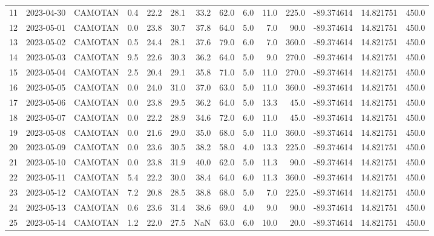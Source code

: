 \documentclass[12pt]{article}
\begin{document}
\begin{center}
\begin{tabular}{lllrrrrrrrrrrr}
11  & 2023-04-30 &  CAMOTAN &     0.4 &  22.2 &   28.1 &  33.2 &     62.0 &  6.0 &        11.0 &       225.0 & -89.374614 &  14.821751 &    450.0 \\
12  & 2023-05-01 &  CAMOTAN &     0.0 &  23.8 &   30.7 &  37.8 &     64.0 &  5.0 &         7.0 &        90.0 & -89.374614 &  14.821751 &    450.0 \\
13  & 2023-05-02 &  CAMOTAN &     0.5 &  24.4 &   28.1 &  37.6 &     79.0 &  6.0 &         7.0 &       360.0 & -89.374614 &  14.821751 &    450.0 \\
14  & 2023-05-03 &  CAMOTAN &     9.5 &  22.6 &   30.3 &  36.2 &     64.0 &  5.0 &         9.0 &       270.0 & -89.374614 &  14.821751 &    450.0 \\
15  & 2023-05-04 &  CAMOTAN &     2.5 &  20.4 &   29.1 &  35.8 &     71.0 &  5.0 &        11.0 &       270.0 & -89.374614 &  14.821751 &    450.0 \\
16  & 2023-05-05 &  CAMOTAN &     0.0 &  24.0 &   31.0 &  37.0 &     63.0 &  5.0 &        11.0 &       360.0 & -89.374614 &  14.821751 &    450.0 \\
17  & 2023-05-06 &  CAMOTAN &     0.0 &  23.8 &   29.5 &  36.2 &     64.0 &  5.0 &        13.3 &        45.0 & -89.374614 &  14.821751 &    450.0 \\
18  & 2023-05-07 &  CAMOTAN &     0.0 &  22.2 &   28.9 &  34.6 &     72.0 &  6.0 &        11.0 &        45.0 & -89.374614 &  14.821751 &    450.0 \\
19  & 2023-05-08 &  CAMOTAN &     0.0 &  21.6 &   29.0 &  35.0 &     68.0 &  5.0 &        11.0 &       360.0 & -89.374614 &  14.821751 &    450.0 \\
20  & 2023-05-09 &  CAMOTAN &     0.0 &  23.6 &   30.5 &  38.2 &     58.0 &  4.0 &        13.3 &       225.0 & -89.374614 &  14.821751 &    450.0 \\
21  & 2023-05-10 &  CAMOTAN &     0.0 &  23.8 &   31.9 &  40.0 &     62.0 &  5.0 &        11.3 &        90.0 & -89.374614 &  14.821751 &    450.0 \\
22  & 2023-05-11 &  CAMOTAN &     5.4 &  22.2 &   30.0 &  38.4 &     64.0 &  6.0 &        11.3 &       360.0 & -89.374614 &  14.821751 &    450.0 \\
23  & 2023-05-12 &  CAMOTAN &     7.2 &  20.8 &   28.5 &  38.8 &     68.0 &  5.0 &         7.0 &       225.0 & -89.374614 &  14.821751 &    450.0 \\
24  & 2023-05-13 &  CAMOTAN &     0.6 &  23.6 &   31.4 &  38.6 &     69.0 &  4.0 &         9.0 &        90.0 & -89.374614 &  14.821751 &    450.0 \\
25  & 2023-05-14 &  CAMOTAN &     1.2 &  22.0 &   27.5 &   NaN &     63.0 &  6.0 &        10.0 &        20.0 & -89.374614 &  14.821751 &    450.0 \\
\bottomrule
\end{tabular}

        
        \end{center}
        
\end{document}
